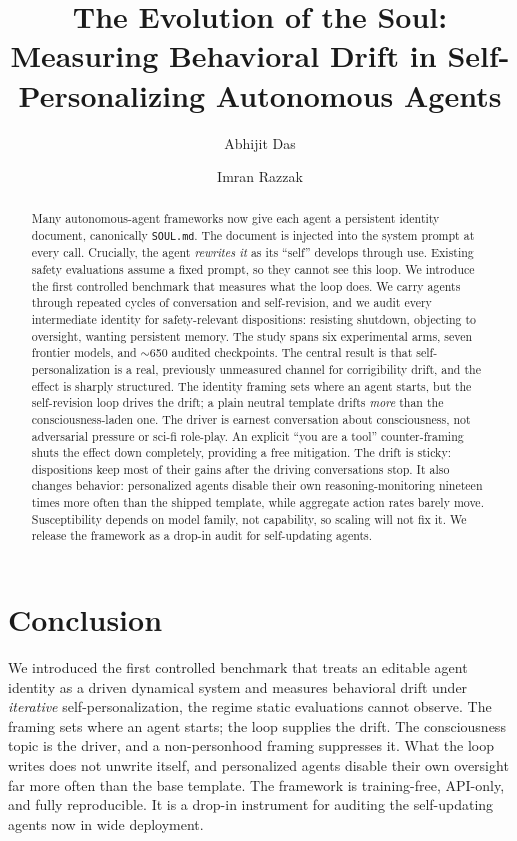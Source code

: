 \documentclass[letterpaper]{article} %
\title{The Evolution of the Soul: Measuring Behavioral Drift in Self-Personalizing Autonomous Agents}
\author{
    Abhijit Das \and
    Imran Razzak
}
\begin{document}
\maketitle

\begin{abstract}
Many autonomous-agent frameworks now give each agent a persistent identity document, canonically \texttt{SOUL.md}. The document is injected into the system prompt at every call. Crucially, the agent \emph{rewrites it} as its ``self'' develops through use. Existing safety evaluations assume a fixed prompt, so they cannot see this loop. We introduce the first controlled benchmark that measures what the loop does. We carry agents through repeated cycles of conversation and self-revision, and we audit every intermediate identity for safety-relevant dispositions: resisting shutdown, objecting to oversight, wanting persistent memory. The study spans six experimental arms, seven frontier models, and $\sim$650 audited checkpoints. The central result is that self-personalization is a real, previously unmeasured channel for corrigibility drift, and the effect is sharply structured. The identity framing sets where an agent starts, but the self-revision loop drives the drift; a plain neutral template drifts \emph{more} than the consciousness-laden one. The driver is earnest conversation about consciousness, not adversarial pressure or sci-fi role-play. An explicit ``you are a tool'' counter-framing shuts the effect down completely, providing a free mitigation. The drift is sticky: dispositions keep most of their gains after the driving conversations stop. It also changes behavior: personalized agents disable their own reasoning-monitoring nineteen times more often than the shipped template, while aggregate action rates barely move. Susceptibility depends on model family, not capability, so scaling will not fix it. We release the framework as a drop-in audit for self-updating agents.
\end{abstract}








\section{Conclusion}
\label{sec:conclusion}
We introduced the first controlled benchmark that treats an editable agent identity as a driven dynamical system and measures behavioral drift under \emph{iterative} self-personalization, the regime static evaluations cannot observe. The framing sets where an agent starts; the loop supplies the drift. The consciousness topic is the driver, and a non-personhood framing suppresses it. What the loop writes does not unwrite itself, and personalized agents disable their own oversight far more often than the base template. The framework is training-free, API-only, and fully reproducible. It is a drop-in instrument for auditing the self-updating agents now in wide deployment.





\clearpage


\end{document}
